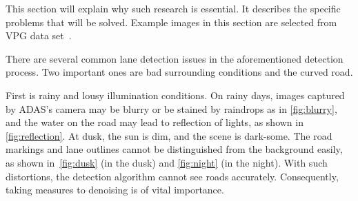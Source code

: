 \begin{spacing}{1.5}
This section will explain why such research is essential. It describes the specific problems that will be solved. Example images in this section are selected from VPG data set~\cite{lee2017vpgnet}.

There are several common lane detection issues in the aforementioned detection process. Two important ones are bad surrounding conditions and the curved road.

First is rainy and lousy illumination conditions. On rainy days, images captured by ADAS’s camera may be blurry or be stained by raindrops as in \autoref{fig:blurry}, and the water on the road may lead to reflection of lights, as shown in \autoref{fig:reflection}. At dusk, the sun is dim, and the scene is dark-some. The road markings and lane outlines cannot be distinguished from the background easily, as shown in~\autoref{fig:dusk} (in the dusk) and \autoref{fig:night} (in the night). With such distortions, the detection algorithm cannot see roads accurately. Consequently, taking measures to denoising is of vital importance. 



\end{spacing}
